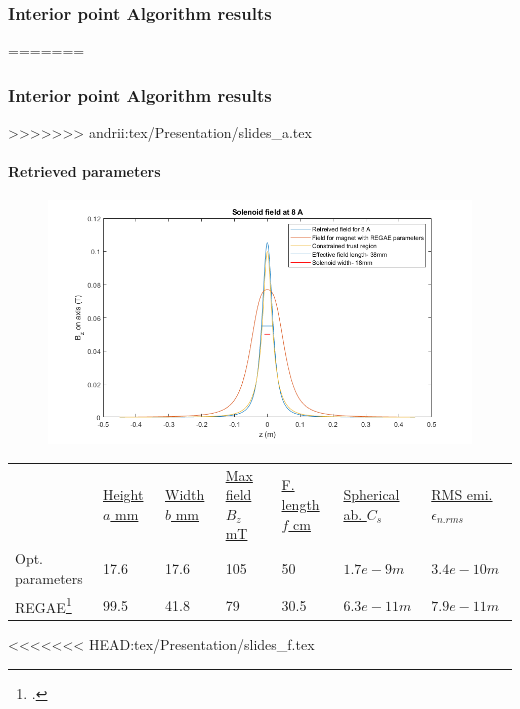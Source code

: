 \documentclass[10pt]{beamer}
\newcommand{\rfn}{\setcounter{footnote}{0}}
\begin{document}
\begin{frame}
  \frametitle{Interior point Algorithm results}
  \rfn
=======

\begin{frame}
  \frametitle{Interior point Algorithm results}
  \rfn
>>>>>>> andrii:tex/Presentation/slides_a.tex
  \framesubtitle{Retrieved parameters}
    \begin{figure}
    \includegraphics[width=.8\textwidth]{retreivedBz.png}
  \end{figure}
    \begin{tiny}
    \begin{table}[t]
    \centering
    \begin{tabular}{    m{1.4cm}|| m{0.9cm}| m{0.9cm} | m{1.2cm}| m{1.1cm}| m{1.5cm}| m{1.5cm}}
    & \underline{Height $a$ mm} & \underline{Width $b$ mm}& \underline{Max field $ B_z$ mT}& \underline{F. length $f$ cm}& \underline{Spherical ab. $C_s$ }& \underline{RMS emi. $\epsilon_{n.rms}$ } \\
    Opt. parameters    &17.6 & 17.6 &105& 50   &$1.7e-9 m$   &$3.4e-10 m$\\
    REGAE\footcite{Disser} & 99.5 & 41.8&79  & 30.5&$6.3e-11 m$ &$7.9e-11 m$\\
  \end{tabular}
  \end{table}
    \end{tiny}
<<<<<<< HEAD:tex/Presentation/slides_f.tex
\end{frame}


\end{frame}
\end{document}

